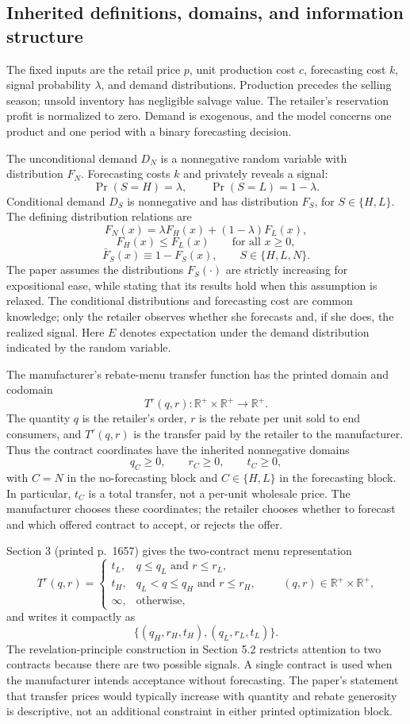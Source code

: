 \documentclass{article}
\begin{document}
\subsection*{Inherited definitions, domains, and information structure}
The fixed inputs are the retail price $p$, unit production cost $c$, forecasting cost $k$, signal probability $\lambda$, and demand distributions. Production precedes the selling season; unsold inventory has negligible salvage value. The retailer's reservation profit is normalized to zero. Demand is exogenous, and the model concerns one product and one period with a binary forecasting decision.

The unconditional demand $D_N$ is a nonnegative random variable with distribution $F_N$. Forecasting costs $k$ and privately reveals a signal:
\[
\Pr(S=H)=\lambda,\qquad \Pr(S=L)=1-\lambda.
\]
Conditional demand $D_S$ is nonnegative and has distribution $F_S$, for $S\in\{H,L\}$. The defining distribution relations are
\[
F_N(x)=\lambda F_H(x)+(1-\lambda)F_L(x),
\]
\[
F_H(x)\leq F_L(x)\qquad\text{for all }x\geq 0,
\]
\[
\bar F_S(x)\equiv 1-F_S(x),\qquad S\in\{H,L,N\}.
\]
The paper assumes the distributions $F_S(\cdot)$ are strictly increasing for expositional ease, while stating that its results hold when this assumption is relaxed. The conditional distributions and forecasting cost are common knowledge; only the retailer observes whether she forecasts and, if she does, the realized signal. Here $E$ denotes expectation under the demand distribution indicated by the random variable.

The manufacturer's rebate-menu transfer function has the printed domain and codomain
\[
T^r(q,r):\mathbb R^+\times\mathbb R^+\longrightarrow\mathbb R^+.
\]
The quantity $q$ is the retailer's order, $r$ is the rebate per unit sold to end consumers, and $T^r(q,r)$ is the transfer paid by the retailer to the manufacturer. Thus the contract coordinates have the inherited nonnegative domains
\[
q_C\geq 0,\qquad r_C\geq 0,\qquad t_C\geq 0,
\]
with $C=N$ in the no-forecasting block and $C\in\{H,L\}$ in the forecasting block. In particular, $t_C$ is a total transfer, not a per-unit wholesale price. The manufacturer chooses these coordinates; the retailer chooses whether to forecast and which offered contract to accept, or rejects the offer.

Section 3 (printed p.~1657) gives the two-contract menu representation
\[
T^r(q,r)=
\begin{cases}
t_L,&q\leq q_L\text{ and }r\leq r_L,\\
t_H,&q_L<q\leq q_H\text{ and }r\leq r_H,\\
\infty,&\text{otherwise},
\end{cases}
\qquad (q,r)\in\mathbb R^+\times\mathbb R^+,
\]
and writes it compactly as
\[
\{(q_H,r_H,t_H),(q_L,r_L,t_L)\}.
\]
The revelation-principle construction in Section 5.2 restricts attention to two contracts because there are two possible signals. A single contract is used when the manufacturer intends acceptance without forecasting. The paper's statement that transfer prices would typically increase with quantity and rebate generosity is descriptive, not an additional constraint in either printed optimization block.
\end{document}
